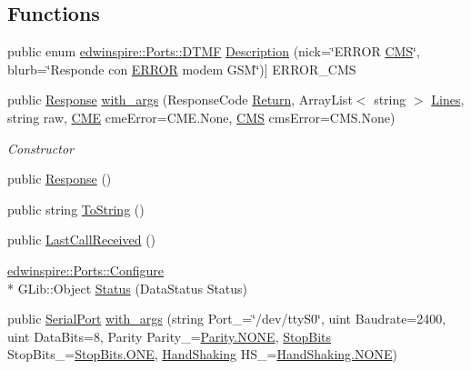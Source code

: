 \subsection*{Functions}
\begin{DoxyCompactItemize}
\item 
public enum \hyperlink{namespaceedwinspire_1_1Ports_a64c52d3ccbb1de87e21d107a90581048}{edwinspire\-::\-Ports\-::\-D\-T\-M\-F} \hyperlink{namespaceedwinspire_1_1Ports_a905164a2fddc409a1789884eb89f74d1}{Description} (nick=\char`\"{}E\-R\-R\-O\-R \hyperlink{namespaceedwinspire_1_1Ports_a0bdbe3cdc235c877ebd86d6a0d36b489}{C\-M\-S}\char`\"{}, blurb=\char`\"{}Responde con \hyperlink{namespaceedwinspire_1_1Ports_a11d2af444a8113fa415c789c21d53b48}{E\-R\-R\-O\-R} modem G\-S\-M\char`\"{})\mbox{]} E\-R\-R\-O\-R\-\_\-\-C\-M\-S
\item 
public \hyperlink{namespaceedwinspire_1_1Ports_afc37e1ee0b1084b5c5fccf2fab440b4f}{Response} \hyperlink{namespaceedwinspire_1_1Ports_a6ef86265a936a529ea91a077ab2f2ca3}{with\-\_\-args} (Response\-Code \hyperlink{namespaceedwinspire_1_1Ports_ab2f8774e65906dad0a298c764f0737df}{Return}, Array\-List$<$ string $>$ \hyperlink{namespaceedwinspire_1_1Ports_a52dc2afb8cadb65ffcdf4d5c1e37a3cf}{Lines}, string raw, \hyperlink{namespaceedwinspire_1_1Ports_a791799a5b274b8e0c84444482227c033}{C\-M\-E} cme\-Error=C\-M\-E.\-None, \hyperlink{namespaceedwinspire_1_1Ports_a0bdbe3cdc235c877ebd86d6a0d36b489}{C\-M\-S} cms\-Error=C\-M\-S.\-None)
\begin{DoxyCompactList}\small\item\em Constructor \end{DoxyCompactList}\item 
public \hyperlink{namespaceedwinspire_1_1Ports_afc37e1ee0b1084b5c5fccf2fab440b4f}{Response} ()
\item 
public string \hyperlink{namespaceedwinspire_1_1Ports_a1d54df4f08e40e31578925d13f6ee9c6}{To\-String} ()
\item 
public \hyperlink{namespaceedwinspire_1_1Ports_a1cb04d0401c5f2277711b286f3199061}{Last\-Call\-Received} ()
\item 
\hyperlink{classedwinspire_1_1Ports_1_1Configure}{edwinspire\-::\-Ports\-::\-Configure} \\*
G\-Lib\-::\-Object \hyperlink{namespaceedwinspire_1_1Ports_aa3f7c9d23312aa446f2b0b8f52efdf34}{Status} (Data\-Status Status)
\item 
public \hyperlink{namespaceedwinspire_1_1Ports_a293ef58b4105463e6bd4b2d5ad9b3144}{Serial\-Port} \hyperlink{namespaceedwinspire_1_1Ports_a9de2452f18841a5338e2c45fbc8cca2d}{with\-\_\-args} (string Port\-\_\-=\char`\"{}/dev/tty\-S0\char`\"{}, uint Baudrate=2400, uint Data\-Bits=8, Parity Parity\-\_\-=\hyperlink{libspire__serial_8vala_a899caa602e4fff675b17cdbab33607ec}{Parity.\-N\-O\-N\-E}, \hyperlink{namespaceedwinspire_1_1Ports_a58bd73af0a389a7cd6e07686e895e849}{Stop\-Bits} Stop\-Bits\-\_\-=\hyperlink{libspire__serial_8vala_a2cb8470634cc90a55800ee95f967eade}{Stop\-Bits.\-O\-N\-E}, \hyperlink{namespaceedwinspire_1_1Ports_afd526aa1ebf856f40b0dfdbef71f7077}{Hand\-Shaking} H\-S\-\_\-=\hyperlink{libspire__serial_8vala_a899caa602e4fff675b17cdbab33607ec}{Hand\-Shaking.\-N\-O\-N\-E})

\end{DoxyCompactItemize}
